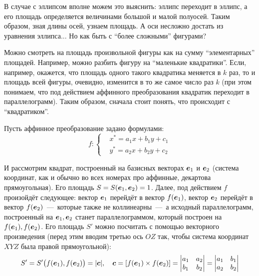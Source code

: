 \documentclass[a4paper,12pt]{article}
\begin{document}
  В случае с эллипсом вполне можем это выяснить: эллипс переходит в эллипс, а его площадь определяется величинами большой и малой полуосей.
  Таким образом, зная длины осей, узнаем площадь.
  А оси несложно достать из уравнения эллипса...
  Но как быть с ``более сложными'' фигурами?
  
  Можно смотреть на площадь произвольной фигуры как на сумму ``элементарных'' площадей.
  Например, можно разбить фигуру на ``маленькие квадратики''.
  Если, например, окажется, что площадь одного такого квадратика меняется в $k$ раз, то и площадь всей фигуры, очевидно, изменится в то же самое число раз $k$ (при этом понимаем, что под действием аффинного преобразования квадратик переходит в параллелограмм).
  Таким образом, сначала стоит понять, что происходит с ``квадратиком''.
  
  Пусть аффинное преобразование задано формулами:
  \begin{equation}\label{eq:affine-for-square-and-length}
    f\colon \left\{
      \begin{aligned}
        &x^* = a_1 x + b_1 y + c_1\\
        &y^* = a_2 x + b_2 y + c_2
      \end{aligned}
    \right.
  \end{equation}
  
  И рассмотрим квадрат, построенный на базисных векторах $\boldsymbol e_1$ и $\boldsymbol e_2$ (система координат, как и обычно во всех номерах про аффинные, декартова прямоугольная).
  Его площадь $S \hm= S(\bds e_1, \bds e_2) \hm= 1$.
  Далее, под действием $f$ произойдёт следующее: вектор $\boldsymbol e_1$ перейдёт в вектор $f(\boldsymbol e_1)$, вектор $\boldsymbol e_2$ перейдёт в вектор $f(\boldsymbol e_2)$~---~которые также не коллинеарны~---~а исходный параллелограмм, построенный на $\boldsymbol e_1, \boldsymbol e_2$ станет параллелограммом, который построен на $f(\boldsymbol e_1), f(\boldsymbol e_2)$.
  Его площадь $S'$ можно посчитать с помощью векторного произведения (перед этим вводим третью ось $OZ$ так, чтобы система координат $XYZ$ была правой прямоугольной):
  \[
    S' = S'\bigl(f(\boldsymbol e_1), f(\boldsymbol e_2)\bigr) = |\boldsymbol c|,\quad \boldsymbol c = [f(\boldsymbol e_1) \times f(\boldsymbol e_2)] = \begin{vmatrix}
      a_1 & a_2\\
      b_1 & b_2
    \end{vmatrix} = \begin{vmatrix}
      a_1 & b_1\\
      a_2 & b_2
    \end{vmatrix}
  \]
  
\end{document}
